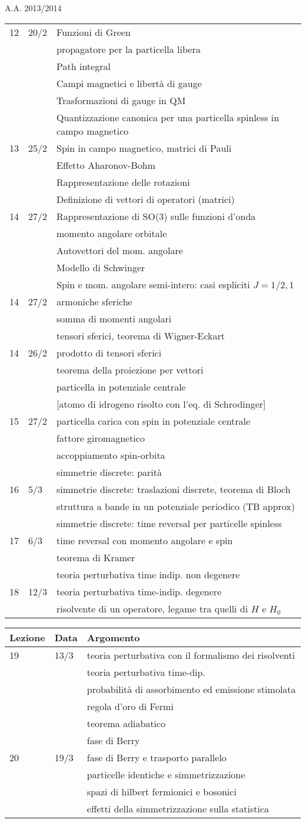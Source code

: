\documentclass[a4paper, 12pt]{article}
\newcommand{\nl}{\\ & & }
\newcommand{\nr}{\\ \midrule}
\begin{document}
\begin{section}{A.A. 2013/2014}
\begin{tabular}{lll}
12 & 20/2 & Funzioni di Green\nl propagatore per la particella libera\nl Path integral\nl Campi magnetici e libertà di gauge\nl Trasformazioni di gauge in QM\nl Quantizzazione canonica per una particella spinless in campo magnetico\nr

13 & 25/2 & Spin in campo magnetico, matrici di Pauli\nl Effetto Aharonov-Bohm\nl Rappresentazione delle rotazioni\nl Definizione di vettori di operatori (matrici) \nr

14 & 27/2 & Rappresentazione di SO(3) sulle funzioni d'onda\nl momento angolare orbitale\nl Autovettori del mom. angolare\nl Modello di Schwinger\nl Spin e mom. angolare semi-intero: casi espliciti $J= 1/2, 1$\nr

14 & 27/2 & armoniche sferiche \nl somma di momenti angolari \nl tensori sferici, teorema di Wigner-Eckart \nr

14 & 26/2 & prodotto di tensori sferici \nl teorema della proiezione per vettori \nl particella in  potenziale centrale \nl [atomo di idrogeno risolto con l'eq. di Schrodinger]\nr

15 & 27/2 & particella carica con spin in potenziale centrale \nl fattore giromagnetico \nl accoppiamento spin-orbita \nl simmetrie discrete: parità \nr 

16 & 5/3 & simmetrie discrete: traslazioni discrete, teorema di Bloch \nl struttura a bande in un potenziale periodico (TB approx) \nl simmetrie discrete: time reversal per particelle spinless  \nr 

17 & 6/3 & time reversal con momento angolare e spin \nl teorema di Kramer \nl teoria perturbativa time indip. non degenere\nr 

18 & 12/3 & teoria perturbativa time-indip. degenere \nl risolvente di un operatore, legame tra quelli di $H$ e $H_0$\nr

\end{tabular}

\begin{tabular}{lll}
Lezione & Data & Argomento\nr

19 & 13/3 & teoria perturbativa con il formalismo dei risolventi \nl teoria perturbativa time-dip. \nl probabilità di assorbimento ed emissione stimolata \nl regola d'oro di Fermi \nl teorema adiabatico \nl fase di Berry \nr 

20 & 19/3 & fase di Berry e trasporto parallelo \nl particelle identiche e simmetrizzazione \nl spazi di hilbert fermionici e bosonici \nl effetti della simmetrizzazione sulla statistica \nr 


\end{tabular}
\end{section}
\end{document}
